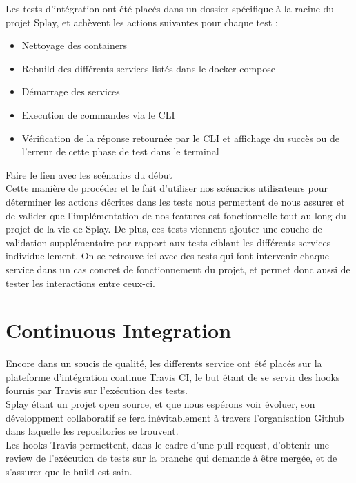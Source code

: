 \documentclass{eplmastersthesis}
\begin{document}
      Les tests d'intégration ont été placés dans un dossier spécifique à la
      racine du projet Splay, et achèvent les actions suivantes pour chaque
      test : \\

      \begin{itemize}
        \item Nettoyage des containers
        \item Rebuild des différents services listés dans le docker-compose
        \item Démarrage des services
        \item Execution de commandes via le CLI
        \item Vérification de la réponse retournée par le CLI et affichage du
        succès ou de l'erreur de cette phase de test dans le terminal
      \end{itemize}

      {\color{red} Faire le lien avec les scénarios du début}\\

      Cette manière de procéder et le fait d'utiliser nos scénarios utilisateurs
      pour déterminer les actions décrites dans les tests nous permettent de
      nous assurer et de valider que l'implémentation de nos features est
      fonctionnelle tout au long du projet de la vie de Splay. De plus, ces
      tests viennent ajouter une couche de validation supplémentaire par rapport
      aux tests ciblant les différents services individuellement. On se retrouve
      ici avec des tests qui font intervenir chaque service dans un cas concret
      de fonctionnement du projet, et permet donc aussi de tester les interactions
      entre ceux-ci.


    \section{Continuous Integration}

      Encore dans un soucis de qualité, les differents service ont été placés
      sur la plateforme d'intégration continue Travis CI, le but étant de se
      servir des hooks fournis par Travis sur l'exécution des tests.\\

      Splay étant un projet open source, et que nous espérons voir évoluer, son
      développment collaboratif se fera inévitablement à travers l'organisation
      Github dans laquelle les repositories se trouvent.\\
      Les hooks Travis permettent, dans le cadre d'une pull request, d'obtenir
      une review de l'exécution de tests sur la branche qui demande à être
      mergée, et de s'assurer que le build est sain.
\end{document}
